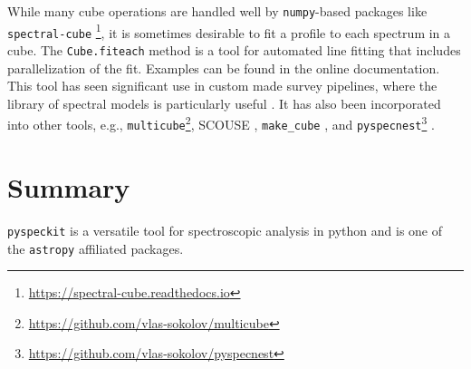 \documentclass[twocolumn]{aastex63}
\newcommand{\pyspeckit}{\texttt{pyspeckit}\xspace}
\newcommand{\astropy}{\texttt{astropy}\xspace}
\begin{document}
While many cube operations are handled well by \texttt{numpy}-based packages
like \texttt{spectral-cube} \citep{Robitaille2016,Ginsburg2019}\footnote{\url{https://spectral-cube.readthedocs.io}},
it is sometimes desirable to fit a profile to each spectrum
in a cube.  The \texttt{Cube.fiteach} method is a tool for automated line
fitting that includes parallelization of the fit.  Examples can be
found in the online documentation. 
This tool  has  seen significant use in 
custom made survey pipelines, where the library of spectral models is particularly useful
\citep[e.g,][\url{https://github.com/GBTAmmoniaSurvey/GAS}]{Friesen2017}. 
 It has also been incorporated into other tools, e.g.,
\texttt{multicube}\footnote{\url{https://github.com/vlas-sokolov/multicube}}, SCOUSE \citep[][see Appendix \ref{appendix:scouse}]{Henshaw2016,Henshaw2019}, \texttt{make\_cube} \citep{Youngblood2016}, and \texttt{pyspecnest}\footnote{\url{https://github.com/vlas-sokolov/pyspecnest}} \citep{Sokolov2020-pyspecnest}.





\section{Summary}
\label{sec:summary}

\texttt{pyspeckit} is a versatile tool for spectroscopic analysis in python and
is one of the \astropy affiliated packages.
% 

\end{document}
